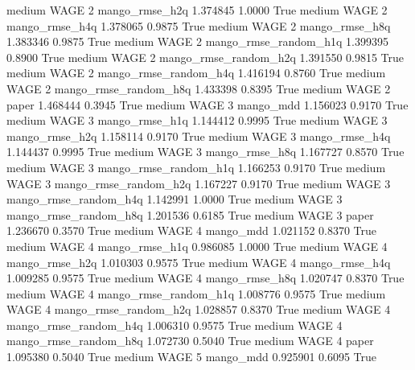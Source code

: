     medium     WAGE                 2        mango_rmse_h2q   1.374845      1.0000    True
    medium     WAGE                 2        mango_rmse_h4q   1.378065      0.9875    True
    medium     WAGE                 2        mango_rmse_h8q   1.383346      0.9875    True
    medium     WAGE                 2 mango_rmse_random_h1q   1.399395      0.8900    True
    medium     WAGE                 2 mango_rmse_random_h2q   1.391550      0.9815    True
    medium     WAGE                 2 mango_rmse_random_h4q   1.416194      0.8760    True
    medium     WAGE                 2 mango_rmse_random_h8q   1.433398      0.8395    True
    medium     WAGE                 2                 paper   1.468444      0.3945    True
    medium     WAGE                 3             mango_mdd   1.156023      0.9170    True
    medium     WAGE                 3        mango_rmse_h1q   1.144412      0.9995    True
    medium     WAGE                 3        mango_rmse_h2q   1.158114      0.9170    True
    medium     WAGE                 3        mango_rmse_h4q   1.144437      0.9995    True
    medium     WAGE                 3        mango_rmse_h8q   1.167727      0.8570    True
    medium     WAGE                 3 mango_rmse_random_h1q   1.166253      0.9170    True
    medium     WAGE                 3 mango_rmse_random_h2q   1.167227      0.9170    True
    medium     WAGE                 3 mango_rmse_random_h4q   1.142991      1.0000    True
    medium     WAGE                 3 mango_rmse_random_h8q   1.201536      0.6185    True
    medium     WAGE                 3                 paper   1.236670      0.3570    True
    medium     WAGE                 4             mango_mdd   1.021152      0.8370    True
    medium     WAGE                 4        mango_rmse_h1q   0.986085      1.0000    True
    medium     WAGE                 4        mango_rmse_h2q   1.010303      0.9575    True
    medium     WAGE                 4        mango_rmse_h4q   1.009285      0.9575    True
    medium     WAGE                 4        mango_rmse_h8q   1.020747      0.8370    True
    medium     WAGE                 4 mango_rmse_random_h1q   1.008776      0.9575    True
    medium     WAGE                 4 mango_rmse_random_h2q   1.028857      0.8370    True
    medium     WAGE                 4 mango_rmse_random_h4q   1.006310      0.9575    True
    medium     WAGE                 4 mango_rmse_random_h8q   1.072730      0.5040    True
    medium     WAGE                 4                 paper   1.095380      0.5040    True
    medium     WAGE                 5             mango_mdd   0.925901      0.6095    True
